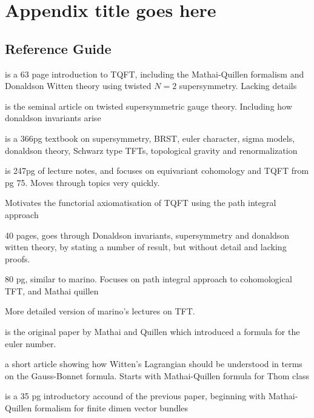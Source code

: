 
\chapter{Appendix title goes here}
\label{appendix1}

\section{Reference Guide}
\cite{cernTQFT} is a 63 page introduction to TQFT, including the Mathai-Quillen
formalism and Donaldson Witten theory using twisted $N=2$ supersymmetry.
Lacking details

\cite{wittenTQFT} is the seminal article on twisted supersymmetric gauge theory.
Including how donaldson invariants arise

\cite{birminghamTFT} is a 366pg textbook on supersymmetry, BRST, euler
character, sigma models, donaldson theory, Schwarz type TFTs, topological
gravity and renormalization

\cite{cordes95} is 247pg of lecture notes, and focuses on equivariant cohomology
and TQFT from pg 75. Moves through topics very quickly.

\cite{axiomTQFTintro} Motivates the functorial axiomatisation of TQFT using the
path integral approach

\cite{marino} 40 pages, goes through Donaldson invariants, supersymmetry and donaldson
witten theory, by stating a number of result, but without detail and lacking
proofs. 

\cite{moore} 80 pg, similar to marino. Focuses on path integral approach to
cohomological TFT, and Mathai quillen

\cite{TQFTbook} More detailed version of marino's lectures on TFT. 

\cite{MQformula} is the original paper by Mathai and Quillen which introduced a
formula for the euler number.

\cite{atiyahlagrangians} a short article showing how Witten's Lagrangian should
be understood in terms on the Gauss-Bonnet formula. Starts with Mathai-Quillen
formula for Thom class

\cite{MQintro} is a 35 pg introductory accound of the previous paper, beginning
with Mathai-Quillen formalism for finite dimen vector bundles




